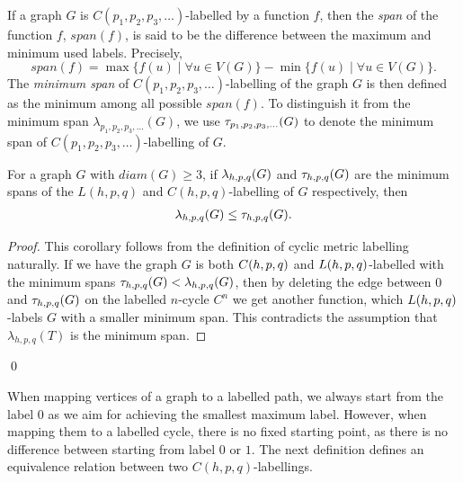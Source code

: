 If a graph $G$ is $C(p_1, p_2, p_3, \dots)$-labelled by a function $f$, then the \emph{span} of the function $f$, $span(f)$, is said to be the difference between the maximum and minimum used labels. Precisely, 
\[
span(f) = \max\{f(u) \mid \forall u \in V(G)\} - \min\{f(u) \mid \forall u \in V(G)\}.
\]
The \emph{minimum span} of $C(p_1, p_2, p_3, \dots)$-labelling of the graph $G$ is then defined as the minimum among all possible $span(f)$. To distinguish it from the minimum span $\lambda_{p_1, p_2, p_3, \dots}(G)$, we use $\tau_{p_1, p_2, p_3, \dots}(G)$ to denote the minimum span of $C(p_1, p_2, p_3, \dots)$-labelling of $G$.

\begin{corollary}
\label{cor:compare}
For a graph $G$ with $diam(G) \ge 3$, if $\lambda_{h,p,q}(G)$ and $\tau_{h,p,q}(G)$ are the minimum spans of the $L(h,p,q)$ and $C(h,p,q)$-labelling of $G$ respectively, then 
\begin{align*}
\lambda_{h,p,q}(G) \le \tau_{h,p,q}(G).
\end{align*} 
\end{corollary}

\begin{proof}
This corollary follows from the definition of cyclic metric labelling naturally. If we have the graph $G$ is both $C(h,p,q)$ and $L(h,p,q)$-labelled with the minimum spans $\tau_{h,p,q}(G) < \lambda_{h,p,q}(G)$, then by deleting the edge between $0$ and $\tau_{h,p,q}(G)$ on the labelled $n$-cycle $C^n$ we get another function, which $L(h,p,q)$-labels $G$ with a smaller minimum span. This contradicts the assumption that $\lambda_{h,p,q}(T)$ is the minimum span.  
\end{proof}
\qed

When mapping vertices of a graph to a labelled path, we always start from the label $0$ as we aim for achieving the smallest maximum label. However, when mapping them to a labelled cycle, there is no fixed starting point, as there is no difference between starting from label $0$ or $1$. The next definition defines an equivalence relation between two $C(h,p,q)$-labellings. 

